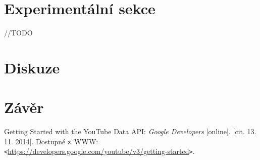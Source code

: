 \documentclass[a4paper,11pt]{article}
\begin{document}
\section{Experimentální sekce}
\par //TODO

\section{Diskuze}


\section{Závěr}


\newpage
\renewcommand{\refname}{Citace}
\begin{thebibliography}{9}
	Getting Started with the YouTube Data API: \textit{Google Developers} [online]. [cit. 13. 11. 2014]. 
	Dostupné z~WWW: \verb|<|\url{https://developers.google.com/youtube/v3/getting-started}\verb|>|.

\end{thebibliography}
\end{document}
